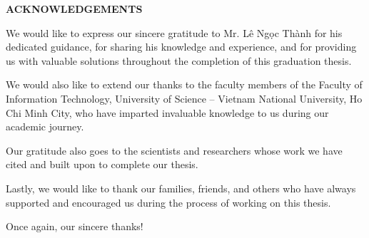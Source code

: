 \vspace{2cm}

{}

{\MakeUppercase\centering\Large\bfseries ACKNOWLEDGEMENTS}

\vspace{2cm}
{
	
We would like to express our sincere gratitude to Mr. Lê Ngọc Thành for his dedicated guidance, for sharing his knowledge and experience, and for providing us with valuable solutions throughout the completion of this graduation thesis.

We would also like to extend our thanks to the faculty members of the Faculty of Information Technology, University of Science – Vietnam National University, Ho Chi Minh City, who have imparted invaluable knowledge to us during our academic journey.

Our gratitude also goes to the scientists and researchers whose work we have cited and built upon to complete our thesis.

Lastly, we would like to thank our families, friends, and others who have always supported and encouraged us during the process of working on this thesis.

Once again, our sincere thanks!

}



\pagebreak
